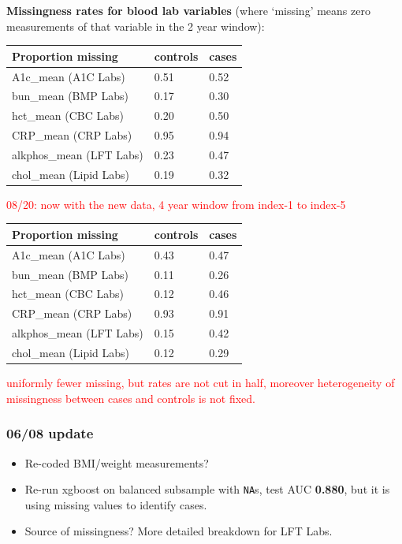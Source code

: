 \documentclass[12pt]{article}
\newcommand{\note}[1]{\textcolor{red}{#1}}
\begin{document}
\textbf{Missingness rates for blood lab variables} (where `missing' means zero measurements of that variable in the 2 year window):
\begin{center}
\begin{tabular}{|l|l|l|}
\hline
\textbf{Proportion missing} & controls & cases \\ \hline
A1c\_mean (A1C Labs) & 0.51 & 0.52 \\ \hline
bun\_mean (BMP Labs) & 0.17 & 0.30 \\ \hline
hct\_mean (CBC Labs) & 0.20 & 0.50 \\ \hline
CRP\_mean (CRP Labs) & 0.95 & 0.94 \\ \hline
alkphos\_mean (LFT Labs) & 0.23 & 0.47 \\ \hline
chol\_mean (Lipid Labs) & 0.19 & 0.32 \\ \hline
\end{tabular}
\end{center}
\note{08/20: now with the new data, 4 year window from index-1 to index-5}
\begin{center}
\begin{tabular}{|l|l|l|}
\hline
\textbf{Proportion missing} & controls & cases \\ \hline
A1c\_mean (A1C Labs) & 0.43 & 0.47 \\ \hline
bun\_mean (BMP Labs) & 0.11 & 0.26 \\ \hline
hct\_mean (CBC Labs) & 0.12 & 0.46 \\ \hline
CRP\_mean (CRP Labs) & 0.93 & 0.91 \\ \hline
alkphos\_mean (LFT Labs) & 0.15 & 0.42 \\ \hline
chol\_mean (Lipid Labs) & 0.12 & 0.29 \\ \hline
\end{tabular}
\end{center}
\note{uniformly fewer missing, but rates are not cut in half, moreover heterogeneity of missingness between cases and controls is not fixed.}

\pagebreak

\subsubsection*{06/08 update}

\begin{itemize}
  \item Re-coded BMI/weight measurements?
  \item Re-run xgboost on balanced subsample with \texttt{NA}s, test AUC \textbf{0.880}, but it is using missing values to identify cases.
  \item Source of missingness? More detailed breakdown for LFT Labs.
\end{itemize}
\end{document}
